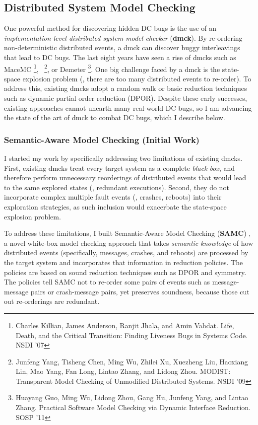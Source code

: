 \documentclass[11pt]{article}
\begin{document}
\subsection{Distributed System Model Checking}

One powerful method for discovering hidden DC bugs is the use of an
\textit{implementation-level distributed system model checker} (\textbf{dmck}).
By re-ordering non-deterministic distributed events, a dmck can discover buggy
interleavings that lead to DC bugs. The last eight years have seen a rise of
dmcks such as MaceMC \footnote{Charles Killian, James Anderson, Ranjit Jhala,
and Amin Vahdat. Life, Death, and the Critical Transition: Finding Liveness Bugs
in Systems Code. NSDI '07}, \modist\ \footnote{Junfeng Yang, Tisheng Chen, Ming
Wu, Zhilei Xu, Xuezheng Liu, Haoxiang Lin, Mao Yang, Fan Long, Lintao Zhang, and
Lidong Zhou. MODIST: Transparent Model Checking of Unmodified Distributed
Systems. NSDI '09}, or Demeter \footnote{Huayang Guo, Ming Wu, Lidong Zhou, Gang
Hu, Junfeng Yang, and Lintao Zhang. Practical Software Model Checking via
Dynamic Interface Reduction. SOSP '11}. One big challenge faced by a dmck is the
state-space explosion problem (\ie, there are too many distributed events to
re-order). To address this, existing dmcks adopt a random walk or basic
reduction techniques such as dynamic partial order reduction (DPOR). Despite
these early successes, existing approaches cannot unearth many real-world DC
bugs, so I am advancing the state of the art of dmck to combat DC bugs, which I
describe below.

\subsubsection{Semantic-Aware Model Checking (Initial Work)} 

I started my work by specifically addressing two limitations of existing dmcks.
First, existing dmcks treat every target system as a complete \textit{black
box}, and therefore perform unnecessary reorderings of distributed events that
would lead to the same explored states (\ie, redundant executions). Second,
they do not incorporate complex multiple fault events (\eg, crashes, reboots)
into their exploration strategies, as such inclusion would exacerbate the
state-space explosion problem.

To address these limitations, I built Semantic-Aware Model Checking
(\textbf{SAMC}) \cite{Leesatapornwongsa+15-SamcIssta,Leesatapornwongsa+14-Samc},
a novel white-box model checking approach that takes \textit{semantic knowledge}
of how distributed events (specifically, messages, crashes, and reboots) are
processed by the target system and incorporates that information in reduction
policies.  The policies are based on sound reduction techniques such as DPOR and
symmetry.  The policies tell SAMC not to re-order some pairs of events such as
message-message pairs or crash-message pairs, yet preserves soundness, because
those cut out re-orderings are redundant.
\end{document}
